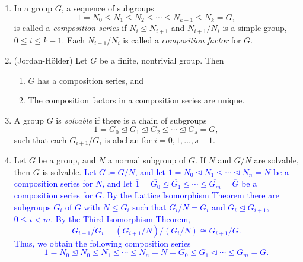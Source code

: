 \documentclass{article}
\newcommand{\expl}[1]{\textcolor{blue}{#1}}
\begin{document}
\begin{enumerate}[resume = algebra]
{		}
		\item In a group $G$, a sequence of subgroups 
		\begin{equation*}
			1 = N_{0} \leq N_{1}\leq N_{2} \leq \dotsm \leq N_{k - 1} \leq N_{k} = G,
		\end{equation*}
		is called a \textit{composition series} if $N_{i} \trianglelefteq N_{i + 1}$ and $N_{i + 1}/N_{i}$ is a simple group, $0 \leq i \leq k - 1$. Each $N_{i + 1}/N_{i}$ is called a \textit{composition factor} for $G$. 
		\item (Jordan-H\"older) Let $G$ be a finite, nontrivial group. Then \vspace{-0.35cm} 
		\begin{enumerate}[itemsep =-2pt,label = (\arabic{*})]
			\item $G$ has a composition series, and 
			\item The composition factors in a composition series are unique. 
		\end{enumerate}
		\item A group $G$ is \textit{solvable} if there is a chain of subgroups 
		\begin{equation*}
			1 = G_{0} \trianglelefteq G_{1} \trianglelefteq G_{2} \trianglelefteq \dotsm \trianglelefteq G_{s} = G, 
		\end{equation*}
		such that each $G_{i + 1}/G_{i}$ is abelian for $i = 0, 1, \ldots, s - 1$. 
		\item Let $G$ be a group, and $N$ a normal subgroup of $G$. If $N$ and $G/N$ are solvable, then $G$ is solvable. \newline \expl{
		Let $\overline{G} \coloneqq G/N$, and let $1 = N_{0} \trianglelefteq N_{1} \trianglelefteq \dotsm \trianglelefteq N_{n}= N$ be a composition series for $N$, and let $\overline{1}= \overline{G_{0}} \trianglelefteq \overline{G_{1}} \trianglelefteq \dotsm \trianglelefteq \overline{G_{m}} = \overline{G}$ be a composition series for $\overline{G}$. By the Lattice Isomorphism Theorem there are subgroups $G_{i}$ of $G$ with $N \leq G_{i}$ such that $G_{i}/N = \overline{G_{i}}$ and $G_{i}\trianglelefteq G_{i + 1}$, $0 \leq i < m$. By the Third Isomorphism Theorem, 
		\begin{equation*}
			\overline{G_{i + 1}}/\overline{G_{i}} = (G_{i + 1}/N)/(G_{i}/N) \cong G_{i + 1}/G. 
		\end{equation*}
		Thus, we obtain the following composition series 
		\begin{equation*}
			1 = N_{0} \trianglelefteq N_{0} \trianglelefteq N_{1} \trianglelefteq \dotsm \trianglelefteq N_{n} = N = G_{0} \trianglelefteq G_{1} \triangleleft \dotsm \trianglelefteq G_{m} = G. 

\end{equation*}}
\end{enumerate}
\end{document}

